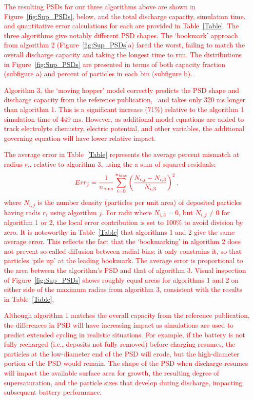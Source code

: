 \documentclass[final,3p,times,twocolumn, 12pt]{elsarticle}
\begin{document}
\textcolor{red}{The resulting PSDs for our three algorithms above are shown in Figure~\ref{fig:Sup_PSDs}, below, and the total discharge capacity, simulation time, and quantitative error calculations for each are provided in Table~\ref{Table}. The three algorithms give notably different PSD shapes. The `bookmark' approach from algorithm 2 (Figure~\ref{fig:Sup_PSDs}a) fared the worst, failing to match the overall discharge capacity and taking the longest time to run.  The distributions in Figure~\ref{fig:Sup_PSDs} are presented in terms of both capacity fraction (subfigure a) and percent of particles in each bin (subfigure b).  }

\textcolor{red}{Algorithm 3, the `moving hopper' model correctly predicts the PSD shape and discharge capacity from the reference publication,~\cite{bib:Verify} and takes only 320 ms longer than algorithm 1. This is a significant increase (71\%) relative to the algorithm 1 simulation time of 449 ms. However, as additional model equations are added to track electrolyte chemistry, electric potential, and other  variables, the additional governing equation will have lower relative impact.}

\textcolor{red}{The average error in Table~\ref{Table} represents the average percent mismatch at radius $r_i$, relative to algorithm 3, using the a sum of squared residuals:}
\begin{equation}\label{eq:psd_error}
    \textcolor{red}{Err_j = \frac{1}{n_{\rm bins}}\sum_{i=0}^{n_{\rm bins}} \left(\frac{N_{i,j} - N_{i,3}}{N_{i,3}}\right)^2,}
\end{equation}
\textcolor{red}{where $N_{i,j}$ is the number density (particles per unit area) of deposited particles having radis $r_i$ using algorithm $j$. For radii where $N_{i,3}=0$, but $N_{i,j}\neq 0$ for algorithm 1 or 2, the local error contribution is set to 100\% to avoid division by zero. It is noteworthy in Table~\ref{Table} that algorithms 1 and 2 give the same average error.  This reflects the fact that the `bookmarking' in algorithm 2 does not prevent so-called diffusion between radial bins; it only constrains it, so that particles `pile up' at the leading bookmark.  The average error is proportional to the area between the algorithm's PSD and that of algorithm 3.  Visual inspection of Figure~\ref{fig:Sup_PSDs} shows roughly equal areas for algorithms 1 and 2 on either side of the maximum radius from algorithm 3, consistent with the results in Table~\ref{Table}.}


\textcolor{red}{Although algorithm 1 matches the overall capacity from the reference publication, the differences in PSD will have increasing impact as simulations are used to predict extended cycling in realistic situations. For example, if the battery is not fully recharged (i.e., deposits not fully removed) before charging resumes, the particles at the low-diameter end of the PSD will erode, but the high-diameter portion of the PSD would remain. The shape of the PSD when discharge resumes will impact the available surface area for growth, the resulting degree of supersaturation, and the particle sizes that develop during discharge, impacting subsequent battery performance.}
\end{document}

